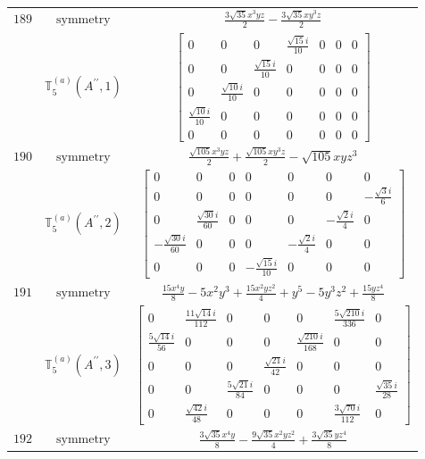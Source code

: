 \documentclass[fleqn,8pt,landscape]{jsarticle}
\begin{document}
\begin{longtable}{ccc}
$ 189 $ & $ \text{symmetry} $ & $ \frac{3 \sqrt{35} x^{3} y z}{2} - \frac{3 \sqrt{35} x y^{3} z}{2} $ \\
$  $ & $ \mathbb{T}_{5}^{(a)}(A^{\prime\prime},1) $ & $ \begin{bmatrix} 0 & 0 & 0 & \frac{\sqrt{15} i}{10} & 0 & 0 & 0 \\ 0 & 0 & \frac{\sqrt{15} i}{10} & 0 & 0 & 0 & 0 \\ 0 & \frac{\sqrt{10} i}{10} & 0 & 0 & 0 & 0 & 0 \\ \frac{\sqrt{10} i}{10} & 0 & 0 & 0 & 0 & 0 & 0 \\ 0 & 0 & 0 & 0 & 0 & 0 & 0 \end{bmatrix} $ \\ \hline
$ 190 $ & $ \text{symmetry} $ & $ \frac{\sqrt{105} x^{3} y z}{2} + \frac{\sqrt{105} x y^{3} z}{2} - \sqrt{105} x y z^{3} $ \\
$  $ & $ \mathbb{T}_{5}^{(a)}(A^{\prime\prime},2) $ & $ \begin{bmatrix} 0 & 0 & 0 & 0 & 0 & 0 & 0 \\ 0 & 0 & 0 & 0 & 0 & 0 & - \frac{\sqrt{3} i}{6} \\ 0 & \frac{\sqrt{30} i}{60} & 0 & 0 & 0 & - \frac{\sqrt{2} i}{4} & 0 \\ - \frac{\sqrt{30} i}{60} & 0 & 0 & 0 & - \frac{\sqrt{2} i}{4} & 0 & 0 \\ 0 & 0 & 0 & - \frac{\sqrt{15} i}{10} & 0 & 0 & 0 \end{bmatrix} $ \\ \hline
$ 191 $ & $ \text{symmetry} $ & $ \frac{15 x^{4} y}{8} - 5 x^{2} y^{3} + \frac{15 x^{2} y z^{2}}{4} + y^{5} - 5 y^{3} z^{2} + \frac{15 y z^{4}}{8} $ \\
$  $ & $ \mathbb{T}_{5}^{(a)}(A^{\prime\prime},3) $ & $ \begin{bmatrix} 0 & \frac{11 \sqrt{14} i}{112} & 0 & 0 & 0 & \frac{5 \sqrt{210} i}{336} & 0 \\ \frac{5 \sqrt{14} i}{56} & 0 & 0 & 0 & \frac{\sqrt{210} i}{168} & 0 & 0 \\ 0 & 0 & 0 & \frac{\sqrt{21} i}{42} & 0 & 0 & 0 \\ 0 & 0 & \frac{5 \sqrt{21} i}{84} & 0 & 0 & 0 & \frac{\sqrt{35} i}{28} \\ 0 & \frac{\sqrt{42} i}{48} & 0 & 0 & 0 & \frac{3 \sqrt{70} i}{112} & 0 \end{bmatrix} $ \\ \hline
$ 192 $ & $ \text{symmetry} $ & $ \frac{3 \sqrt{35} x^{4} y}{8} - \frac{9 \sqrt{35} x^{2} y z^{2}}{4} + \frac{3 \sqrt{35} y z^{4}}{8} $ \\

\end{longtable}
\end{document}

